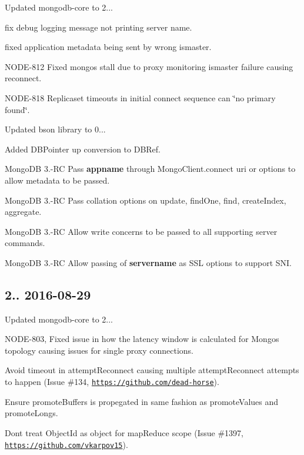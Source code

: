 \begin{DoxyItemize}
\item Updated mongodb-\/core to 2...
\item fix debug logging message not printing server name.
\item fixed application metadata being sent by wrong ismaster.
\item N\+O\+D\+E-\/812 Fixed mongos stall due to proxy monitoring ismaster failure causing reconnect.
\item N\+O\+D\+E-\/818 Replicaset timeouts in initial connect sequence can \char`\"{}no primary found\char`\"{}.
\item Updated bson library to 0...
\item Added D\+B\+Pointer up conversion to D\+B\+Ref.
\item Mongo\+DB 3.-\/\+RC Pass {\bfseries appname} through Mongo\+Client.\+connect uri or options to allow metadata to be passed.
\item Mongo\+DB 3.-\/\+RC Pass collation options on update, find\+One, find, create\+Index, aggregate.
\item Mongo\+DB 3.-\/\+RC Allow write concerns to be passed to all supporting server commands.
\item Mongo\+DB 3.-\/\+RC Allow passing of {\bfseries servername} as S\+SL options to support S\+NI.
\end{DoxyItemize}

\subsection*{2.. 2016-\/08-\/29 }


\begin{DoxyItemize}
\item Updated mongodb-\/core to 2...
\item N\+O\+D\+E-\/803, Fixed issue in how the latency window is calculated for Mongos topology causing issues for single proxy connections.
\item Avoid timeout in attempt\+Reconnect causing multiple attempt\+Reconnect attempts to happen (Issue \#134, \href{https://github.com/dead-horse}{\tt https\+://github.\+com/dead-\/horse}).
\item Ensure promote\+Buffers is propegated in same fashion as promote\+Values and promote\+Longs.
\item Don\textquotesingle{}t treat Object\+Id as object for map\+Reduce scope (Issue \#1397, \href{https://github.com/vkarpov15}{\tt https\+://github.\+com/vkarpov15}).
\end{DoxyItemize}

